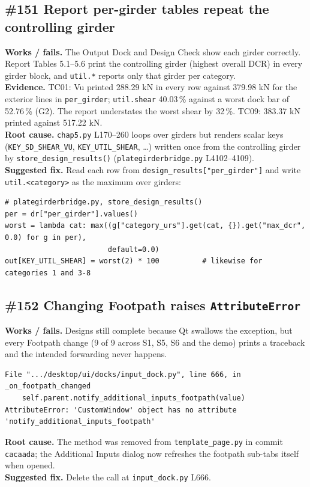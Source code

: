\documentclass[11pt,a4paper]{article}
\newcommand{\src}[1]{\texttt{#1}}
\begin{document}
\subsection{\#151 Report per-girder tables repeat the controlling girder}
\textbf{Works / fails.} The Output Dock and Design Check show each girder correctly. Report Tables 5.1--5.6 print the
controlling girder (highest overall DCR) in every girder block, and \texttt{util.*} reports only that girder per category.\\
\textbf{Evidence.} TC01: Vu printed 288.29 kN in every row against 379.98 kN for the exterior lines in \texttt{per\_girder};
\texttt{util.shear} 40.03\,\% against a worst dock bar of 52.76\,\% (G2). The report understates the worst shear by 32\,\%. TC09:
383.37 kN printed against 517.22 kN.\\
\textbf{Root cause.} \src{chap5.py} L170--260 loops over girders but renders scalar keys (\texttt{KEY\_SD\_SHEAR\_VU},
\texttt{KEY\_UTIL\_SHEAR}, \ldots) written once from the controlling girder by \texttt{store\_design\_results()}
(\src{plategirderbridge.py} L4102--4109).\\
\textbf{Suggested fix.} Read each row from \texttt{design\_results["per\_girder"]} and write \texttt{util.<category>} as the
maximum over girders:
\begin{Verbatim}[frame=single,framesep=5pt,fontsize=\footnotesize,samepage=true]
# plategirderbridge.py, store_design_results()
per = dr["per_girder"].values()
worst = lambda cat: max((g["category_urs"].get(cat, {}).get("max_dcr", 0.0) for g in per),
                        default=0.0)
out[KEY_UTIL_SHEAR] = worst(2) * 100          # likewise for categories 1 and 3-8
\end{Verbatim}

\subsection{\#152 Changing Footpath raises \texttt{AttributeError}}
\textbf{Works / fails.} Designs still complete because Qt swallows the exception, but every Footpath change (9 of 9 across S1,
S5, S6 and the demo) prints a traceback and the intended forwarding never happens.
\begin{Verbatim}[frame=single,framesep=5pt,fontsize=\footnotesize,samepage=true]
File ".../desktop/ui/docks/input_dock.py", line 666, in _on_footpath_changed
    self.parent.notify_additional_inputs_footpath(value)
AttributeError: 'CustomWindow' object has no attribute 'notify_additional_inputs_footpath'
\end{Verbatim}
\textbf{Root cause.} The method was removed from \src{template\_page.py} in commit \texttt{cacaada}; the Additional Inputs dialog
now refreshes the footpath sub-tabs itself when opened.\\
\textbf{Suggested fix.} Delete the call at \src{input\_dock.py} L666.
\end{document}
